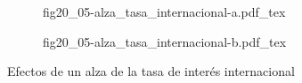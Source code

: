 \begin{figure}[h]
\captionsetup[subfigure]{aboveskip=20pt,belowskip=15pt}
\centering
\begin{subfigure}{.45\textwidth}
  \centering
        \def\svgwidth{\textwidth}
        {fig20_05-alza_tasa_internacional-a.pdf_tex}
\end{subfigure}\hspace{.05\textwidth}
\begin{subfigure}{.45\textwidth}
  \centering
        \def\svgwidth{\textwidth}
        {fig20_05-alza_tasa_internacional-b.pdf_tex}
\end{subfigure}
\caption{Efectos de un alza de la tasa de interés internacional}
\label{fig20_05-alza_tasa_internacional}
\end{figure}